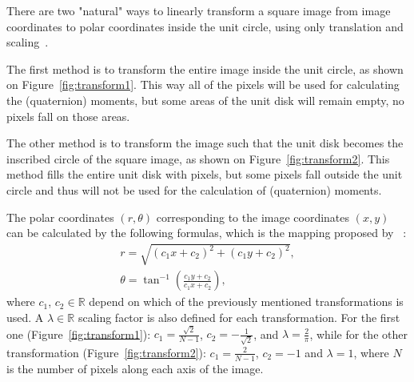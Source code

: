 There are two "natural" ways to linearly transform a square image from image coordinates to polar coordinates inside the unit circle, using only translation and scaling~\cite{kintner}.

The first method is to transform the entire image inside the unit circle, as shown on Figure~\ref{fig:transform1}. This way all of the pixels will be used for calculating the (quaternion) moments, but some areas of the unit disk will remain empty, no pixels fall on those areas.

The other method is to transform the image such that the unit disk becomes the inscribed circle of the square image, as shown on Figure~\ref{fig:transform2}. This method fills the entire unit disk with pixels, but some pixels fall outside the unit circle and thus will not be used for the calculation of (quaternion) moments.

The polar coordinates $(r,\theta)$ corresponding to the image coordinates $(x,y)$ can be calculated by the following formulas, which is the mapping proposed by \citeauthor{Chong}~\cite{Chong}:
\begin{gather*}
  r = \sqrt{(c_1x + c_2)^2 + (c_1y + c_2)^2}, \\
  \theta = \tan^{-1}\left(\frac{c_1y + c_2}{c_1x + c_2}\right),
\end{gather*}
where $c_1$, $c_2 \in \mathds{R}$ depend on which of the previously mentioned transformations is used. A $\lambda \in \mathds{R}$ scaling factor is also defined for each transformation.
For the first one (Figure~\ref{fig:transform1}): $c_1 = \frac{\sqrt{2}}{N - 1}$, $c_2 = -\frac{1}{\sqrt{2}}$, and $\lambda = \frac{2}{\pi}$, while for the other transformation (Figure~\ref{fig:transform2}): $c_1 = \frac{2}{N - 1}$, $c_2 = -1$ and $\lambda = 1$, where $N$ is the number of pixels along each axis of the image.
  
